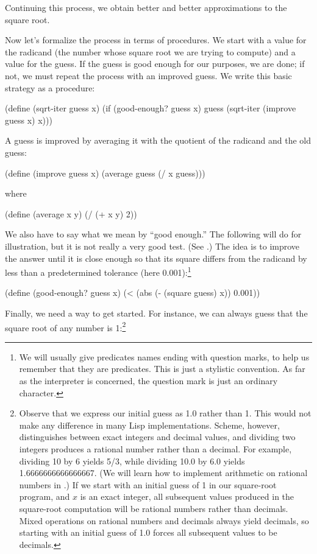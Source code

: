 \noindent
Continuing this process, we obtain better and better approximations to the
square root.

Now let's formalize the process in terms of procedures.  We start with a value
for the radicand (the number whose square root we are trying to compute) and a
value for the guess.  If the guess is good enough for our purposes, we are
done; if not, we must repeat the process with an improved guess.  We write this
basic strategy as a procedure:

\begin{codeBlock}
(define (sqrt-iter guess x)
  (if (good-enough? guess x)
      guess
      (sqrt-iter (improve guess x) x)))
\end{codeBlock}

\noindent
A guess is improved by averaging it with the quotient of the radicand and the
old guess:

\begin{codeBlock}
(define (improve guess x)
  (average guess (/ x guess)))
\end{codeBlock}

\noindent
where

\begin{codeBlock}
(define (average x y)
  (/ (+ x y) 2))
\end{codeBlock}

\noindent
We also have to say what we mean by ``good enough.''  The following will do for
illustration, but it is not really a very good test.  (See .)
The idea is to improve the answer until it is close
enough so that its square differs from the radicand by less than a
predetermined tolerance (here 0.001):\footnote{We will usually give predicates
names ending with question marks, to help us remember that they are predicates.
This is just a stylistic convention.  As far as the interpreter is concerned,
the question mark is just an ordinary character.}

\begin{codeBlock}
(define (good-enough? guess x)
  (< (abs (- (square guess) x)) 0.001))
\end{codeBlock}

\noindent
Finally, we need a way to get started.  For instance, we can always guess that
the square root of any number is 1:\footnote{Observe that we express our
initial guess as 1.0 rather than 1.  This would not make any difference in many
Lisp implementations.   Scheme, however, distinguishes between
exact integers and decimal values, and dividing two integers produces a
rational number rather than a decimal.  For example, dividing 10 by 6 yields
5/3, while dividing 10.0 by 6.0 yields 1.6666666666666667.  (We will learn how
to implement arithmetic on rational numbers in .)  If we
start with an initial guess of 1 in our square-root program, and \( x \) is an
exact integer, all subsequent values produced in the square-root computation
will be rational numbers rather than decimals.  Mixed operations on rational
numbers and decimals always yield decimals, so starting with an initial guess
of 1.0 forces all subsequent values to be decimals.}

